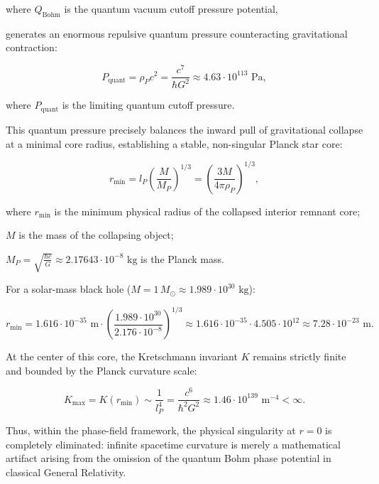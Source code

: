 where $Q_{\text{Bohm}}$ is the quantum vacuum cutoff pressure potential,

generates an enormous repulsive quantum pressure counteracting gravitational contraction:

\begin{equation}\label{eq:5.55}\tag{5.55}
P_{\text{quant}} = \rho_P c^2 = \frac{c^7}{\hbar G^2} \approx 4.63 \cdot 10^{113}\text{ Pa},
\end{equation}

where $P_{\text{quant}}$ is the limiting quantum cutoff pressure.

This quantum pressure precisely balances the inward pull of gravitational collapse at a minimal core radius, establishing a stable, non-singular Planck star core:

\begin{equation}\label{eq:5.56}\tag{5.56}
r_{\text{min}} = l_P \left( \frac{M}{M_P} \right)^{1/3} = \left( \frac{3 M}{4\pi \rho_P} \right)^{1/3},
\end{equation}

where $r_{\text{min}}$ is the minimum physical radius of the collapsed interior remnant core;  

$M$ is the mass of the collapsing object;  

$M_P = \sqrt{\frac{\hbar c}{G}} \approx 2.17643 \cdot 10^{-8}\text{ kg}$ is the Planck mass.

For a solar-mass black hole ($M = 1\,M_\odot \approx 1.989 \cdot 10^{30}\text{ kg}$):

\begin{equation}\label{eq:5.57}\tag{5.57}
r_{\text{min}} = 1.616 \cdot 10^{-35}\text{ m} \cdot \left( \frac{1.989 \cdot 10^{30}}{2.176 \cdot 10^{-8}} \right)^{1/3} \approx 1.616 \cdot 10^{-35} \cdot 4.505 \cdot 10^{12} \approx 7.28 \cdot 10^{-23}\text{ m}.
\end{equation}

At the center of this core, the Kretschmann invariant $K$ remains strictly finite and bounded by the Planck curvature scale:

\begin{equation}\label{eq:5.58}\tag{5.58}
K_{\text{max}} = K(r_{\text{min}}) \sim \frac{1}{l_P^4} = \frac{c^6}{\hbar^2 G^2} \approx 1.46 \cdot 10^{139}\text{ m}^{-4} < \infty.
\end{equation}

Thus, within the phase-field framework, the physical singularity at $r = 0$ is completely eliminated: infinite spacetime curvature is merely a mathematical artifact arising from the omission of the quantum Bohm phase potential in classical General Relativity.


